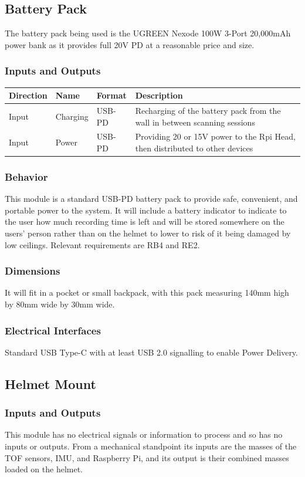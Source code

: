 \documentclass[11pt]{article}
\begin{document}
	\subsection{Battery Pack}
		The battery pack being used is the UGREEN Nexode 100W 3-Port 20,000mAh power bank \cite{power_bank} as it provides full 20V PD at a reasonable price and size. 
		\subsubsection{Inputs and Outputs}
			\begin{tabularx}{\textwidth}{X X X p{}}
				\toprule
				\textbf{Direction} & \textbf{Name} & \textbf{Format} & \textbf{Description} \\
				\midrule
				Input & Charging & USB-PD & Recharging of the battery pack from the wall in between scanning sessions \\
				Input & Power & USB-PD & Providing 20 or 15V power to the Rpi Head, then distributed to other devices \\
				\bottomrule
			\end{tabularx}
		\subsubsection{Behavior}
			This module is a standard USB-PD battery pack to provide safe, convenient, and portable power to the system. It will include a battery indicator to indicate to the user how much recording time is left and will be stored somewhere on the users’ person rather than on the helmet to lower to risk of it being damaged by low ceilings. Relevant requirements are RB4 and RE2.
		\subsubsection{Dimensions}
			It will fit in a pocket or small backpack, with this pack measuring 140mm high by 80mm wide by 30mm wide. 
		\subsubsection{Electrical Interfaces}
			Standard USB Type-C with at least USB 2.0 signalling to enable Power Delivery. 

	\subsection{Helmet Mount}
		\subsubsection{Inputs and Outputs}
			This module has no electrical signals or information to process and so has no inputs or outputs. From a mechanical standpoint its inputs are the masses of the TOF sensors, IMU, and Raspberry Pi, and its output is their combined masses loaded on the helmet. 
\end{document}
